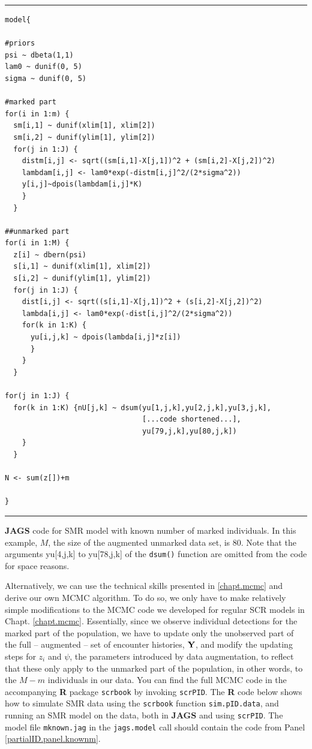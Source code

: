 \begin{panel}[htp]
\centering
\rule[0.15in]{\textwidth}{.03in}
{\small
\begin{verbatim}
model{

#priors
psi ~ dbeta(1,1)
lam0 ~ dunif(0, 5)
sigma ~ dunif(0, 5)

#marked part
for(i in 1:m) {
  sm[i,1] ~ dunif(xlim[1], xlim[2])
  sm[i,2] ~ dunif(ylim[1], ylim[2])
  for(j in 1:J) {
    distm[i,j] <- sqrt((sm[i,1]-X[j,1])^2 + (sm[i,2]-X[j,2])^2)
    lambdam[i,j] <- lam0*exp(-distm[i,j]^2/(2*sigma^2))
    y[i,j]~dpois(lambdam[i,j]*K)
    }
  }

##unmarked part
for(i in 1:M) {
  z[i] ~ dbern(psi)
  s[i,1] ~ dunif(xlim[1], xlim[2])
  s[i,2] ~ dunif(ylim[1], ylim[2])
  for(j in 1:J) {
    dist[i,j] <- sqrt((s[i,1]-X[j,1])^2 + (s[i,2]-X[j,2])^2)
    lambda[i,j] <- lam0*exp(-dist[i,j]^2/(2*sigma^2))
    for(k in 1:K) {
      yu[i,j,k] ~ dpois(lambda[i,j]*z[i])
      }
    }
  }

for(j in 1:J) {
  for(k in 1:K) {nU[j,k] ~ dsum(yu[1,j,k],yu[2,j,k],yu[3,j,k],
								[...code shortened...],
								yu[79,j,k],yu[80,j,k])
	}
  }

N <- sum(z[])+m

}
\end{verbatim}
}
\rule[-0.15in]{\textwidth}{.03in}
\caption{
{\bf JAGS} code for SMR model with known number of marked individuals. In this example, $M$, the size of the augmented unmarked data set, is 80. Note that the arguments yu[4,j,k] to yu[78,j,k] of the {\tt dsum()} function are omitted from the code for space reasons.
}
\label{partialID.panel.knownm}
\end{panel}

Alternatively, we can use the technical skills presented in \ref{chapt.mcmc} and derive our own MCMC algorithm. To do so, we only have to make relatively
simple modifications to the MCMC code we developed for regular SCR models in
Chapt. \ref{chapt.mcmc}.
Essentially, since we observe individual detections for the marked part of the population, we have to update only the unobserved part of the full -- augmented -- set of encounter histories, ${\bf Y}$, and
modify the updating steps for $z_i$ and $\psi$, the parameters introduced by data augmentation, to reflect that these only apply to the unmarked part of the population, in other words, to the $M-m$ individuals in our data. You can find the full MCMC code in the accompanying {\bf R} package {\tt scrbook} by invoking {\tt scrPID}. The {\bf R} code below shows how to simulate SMR data using the {\tt scrbook} function {\tt sim.pID.data}, and running an SMR model on the data, both in {\bf JAGS} and using {\tt scrPID}. The model file {\tt mknown.jag} in the {\tt jags.model} call should contain the code from Panel \ref{partialID.panel.knownm}.

